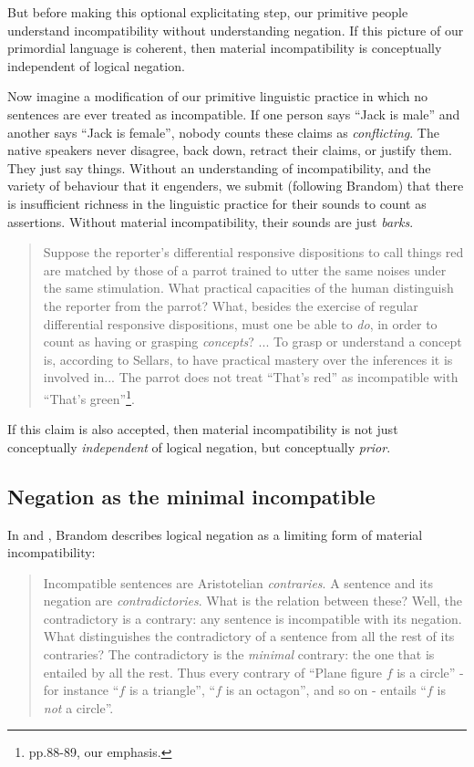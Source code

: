 \NI But before making this optional
explicitating step, our primitive people understand incompatibility
without understanding negation.  If this picture of our primordial
language is coherent, then material incompatibility is conceptually
independent of logical negation.

Now imagine a modification of our primitive linguistic practice in
which no sentences are ever treated as incompatible.  If one person
says ``Jack is male'' and another says ``Jack is female'', nobody
counts these claims as \emph{conflicting}.  The native speakers never
disagree, back down, retract their claims, or justify them. They just
say things.  Without an understanding of incompatibility, and the
variety of behaviour that it engenders, we submit (following Brandom)
that there is insufficient richness in the linguistic practice for
their sounds to count as assertions.  Without material
incompatibility, their sounds are just \emph{barks}.
\begin{quote}

  Suppose the reporter's differential responsive dispositions to call
  things red are matched by those of a parrot trained to utter the
  same noises under the same stimulation. What practical capacities of
  the human distinguish the reporter from the parrot? What, besides
  the exercise of regular differential responsive dispositions, must
  one be able to \emph{do}, in order to count as having or grasping
  \emph{concepts}? ... To grasp or understand a concept is, according
  to Sellars, to have practical mastery over the inferences it is
  involved in... The parrot does not treat ``That's red'' as
  incompatible with ``That's green''\footnote{\cite{brandom2}
    pp.88-89, our emphasis.}.
\end{quote}

\NI If this claim is also accepted, then material incompatibility is
not just conceptually \emph{independent} of logical negation, but
conceptually \emph{prior}.  

\subsection{Negation as the minimal incompatible}

In \cite{brandom2} and \cite{brandom}, Brandom describes 
logical negation as a limiting form of material incompatibility:
\begin{quote}
Incompatible sentences are Aristotelian \emph{contraries}. A sentence
and its negation are \emph{contradictories}. What is the relation
between these? Well, the contradictory is a contrary: any sentence is
incompatible with its negation. What distinguishes the contradictory
of a sentence from all the rest of its contraries? The contradictory
is the \emph{minimal} contrary: the one that is entailed by all the
rest. Thus every contrary of ``Plane figure $f$ is a circle'' - for
instance ``$f$ is a triangle'', ``$f$ is an octagon'', and so on -
entails ``$f$ is \emph{not} a circle''.
\end{quote}

